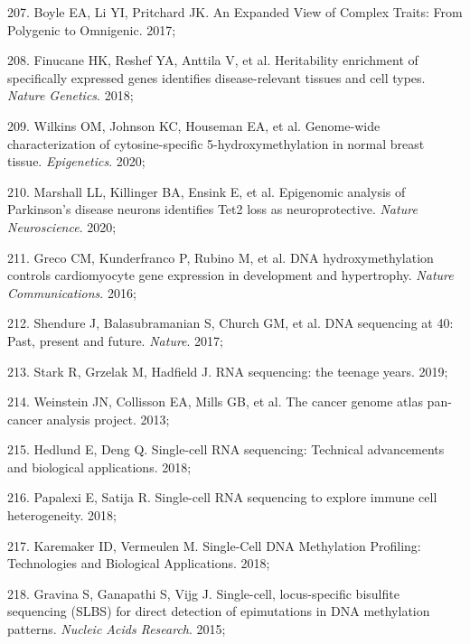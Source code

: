 \documentclass[11pt,oneside]{bristolthesis}
\newenvironment{cslreferences}%
  {}%
  {\par}
\begin{document}
\begin{cslreferences}
\leavevmode\hypertarget{ref-Boyle2017}{}%
207. Boyle EA, Li YI, Pritchard JK. An Expanded View of Complex Traits: From Polygenic to Omnigenic. 2017;

\leavevmode\hypertarget{ref-Finucane2018}{}%
208. Finucane HK, Reshef YA, Anttila V, et al. Heritability enrichment of specifically expressed genes identifies disease-relevant tissues and cell types. \emph{Nature Genetics}. 2018;

\leavevmode\hypertarget{ref-Wilkins2020}{}%
209. Wilkins OM, Johnson KC, Houseman EA, et al. Genome-wide characterization of cytosine-specific 5-hydroxymethylation in normal breast tissue. \emph{Epigenetics}. 2020;

\leavevmode\hypertarget{ref-Marshall2020}{}%
210. Marshall LL, Killinger BA, Ensink E, et al. Epigenomic analysis of Parkinson's disease neurons identifies Tet2 loss as neuroprotective. \emph{Nature Neuroscience}. 2020;

\leavevmode\hypertarget{ref-Greco2016}{}%
211. Greco CM, Kunderfranco P, Rubino M, et al. DNA hydroxymethylation controls cardiomyocyte gene expression in development and hypertrophy. \emph{Nature Communications}. 2016;

\leavevmode\hypertarget{ref-Shendure2017}{}%
212. Shendure J, Balasubramanian S, Church GM, et al. DNA sequencing at 40: Past, present and future. \emph{Nature}. 2017;

\leavevmode\hypertarget{ref-Stark2019}{}%
213. Stark R, Grzelak M, Hadfield J. RNA sequencing: the teenage years. 2019;

\leavevmode\hypertarget{ref-Weinstein2013}{}%
214. Weinstein JN, Collisson EA, Mills GB, et al. The cancer genome atlas pan-cancer analysis project. 2013;

\leavevmode\hypertarget{ref-Hedlund2018}{}%
215. Hedlund E, Deng Q. Single-cell RNA sequencing: Technical advancements and biological applications. 2018;

\leavevmode\hypertarget{ref-Papalexi2018}{}%
216. Papalexi E, Satija R. Single-cell RNA sequencing to explore immune cell heterogeneity. 2018;

\leavevmode\hypertarget{ref-Karemaker2018}{}%
217. Karemaker ID, Vermeulen M. Single-Cell DNA Methylation Profiling: Technologies and Biological Applications. 2018;

\leavevmode\hypertarget{ref-Gravina2015}{}%
218. Gravina S, Ganapathi S, Vijg J. Single-cell, locus-specific bisulfite sequencing (SLBS) for direct detection of epimutations in DNA methylation patterns. \emph{Nucleic Acids Research}. 2015;


\end{cslreferences}
\end{document}
